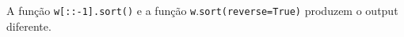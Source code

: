 \documentclass[12pt,varwidth=16cm,border=1pt]{standalone}
\begin{document}
A função \verb+w+\verb+[::-1].sort()+ e a função \verb+w+.\verb+sort(reverse=True)+ produzem o output diferente.

\questiomtrue
\end{document}
